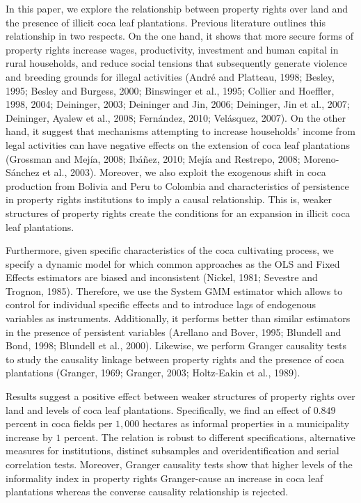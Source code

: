 In this paper, we explore the relationship between property rights over land and the presence of illicit coca leaf plantations. Previous literature outlines this relationship in two respects. On the one hand, it shows that more secure forms of property rights increase wages, productivity, investment and human capital in rural households, and reduce social tensions that subsequently generate violence and breeding grounds for illegal activities (Andr\'{e} and Platteau, 1998; Besley, 1995; Besley and Burgess, 2000; Binswinger et al., 1995; Collier and Hoeffler, 1998, 2004; Deininger, 2003; Deininger and Jin, 2006; Deininger, Jin et al., 2007; Deininger, Ayalew et al., 2008; Fern\'{a}ndez, 2010; Vel\'{a}squez, 2007). On the other hand, it suggest that mechanisms attempting to increase households' income from legal activities can have negative effects on the extension of coca leaf plantations (Grossman and Mej\'{i}a, 2008; Ib\'{a}\~{n}ez, 2010; Mej\'{i}a and Restrepo, 2008; Moreno-S\'{a}nchez et al., 2003). Moreover, we also exploit the exogenous shift in coca production from Bolivia and Peru to Colombia and characteristics of persistence in property rights institutions to imply a causal relationship. This is, weaker structures of property rights create the conditions for an expansion in illicit coca leaf plantations.

Furthermore, given specific characteristics of the coca cultivating process, we specify a dynamic model for which common approaches as the OLS and Fixed Effects estimators are biased and inconsistent (Nickel, 1981; Sevestre and Trognon, 1985). Therefore, we use the System GMM estimator which allows to control for individual specific effects and to introduce lags of endogenous variables as instruments. Additionally, it performs better than similar estimators in the presence of persistent variables (Arellano and Bover, 1995; Blundell and Bond, 1998; Blundell et al., 2000). Likewise, we perform Granger causality tests to study the causality linkage between property rights and the presence of coca plantations (Granger, 1969; Granger, 2003; Holtz-Eakin et al., 1989).

Results suggest a positive effect between weaker structures of property rights over land and levels of coca leaf plantations. Specifically, we find an effect of $0.849$ percent in coca fields per $1,000$ hectares as informal properties in a municipality increase by $1$ percent. The relation is robust to different specifications, alternative measures for institutions, distinct subsamples and overidentification and serial correlation tests. Moreover, Granger causality tests show that higher levels of the informality index in property rights Granger-cause an increase in coca leaf plantations whereas the converse causality relationship is rejected.

